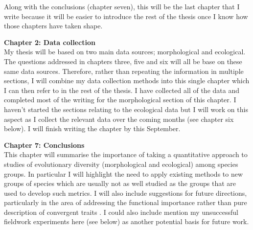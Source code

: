 \documentclass[12pt,a4paper]{article}
\begin{document}
Along with the conclusions (chapter seven), this will be the last chapter that I write because it will be easier to introduce the rest of the thesis once I know how those chapters have taken shape. 

\textbf{Chapter 2: Data collection}\\

My thesis will be based on two main data sources; morphological and ecological. The questions addressed in chapters three, five and six will all be base on these same data sources. Therefore, rather than repeating the information in multiple sections, I will combine my data collection methods into this single chapter which I can then refer to in the rest of the thesis. 
I have collected all of the data and completed most of the writing for the morphological section of this chapter. I haven't started the sections relating to the ecological data but I will work on this aspect as I collect the relevant data over the coming months (see chapter six below). I will finish writing the chapter by this September.



\textbf{Chapter 7: Conclusions}\\


This chapter will summarise the importance of taking a quantitative approach to studies of evolutionary diversity (morphological and ecological) among species groups. In particular I will highlight the need to apply existing methods to new groups of species which are usually not as well studied as the groups that are used to develop such metrics. I will also include suggestions for future directions, particularly in the area of addressing the functional importance rather than pure description of convergent traits \citep{Losos2010}. I could also include mention my unsuccessful fieldwork experiments here (see below) as another potential basis for future work. 



\end{document}
